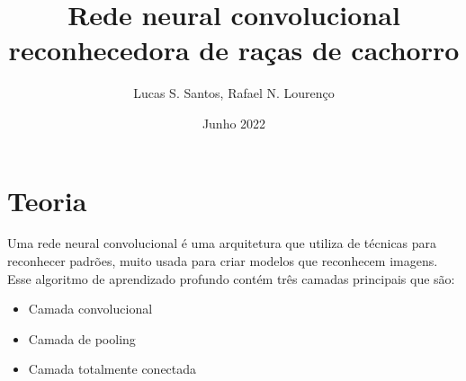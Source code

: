 \documentclass{article}
\title{Rede neural convolucional reconhecedora de raças de cachorro}
\author{Lucas S. Santos, Rafael N. Lourenço}
\date{Junho 2022}
\begin{document}
\maketitle
\newpage
\section{Teoria}
Uma rede neural convolucional é uma arquitetura que utiliza de técnicas para reconhecer padrões, muito usada para criar modelos que reconhecem imagens.
Esse algoritmo de aprendizado profundo contém três camadas principais que são:
\begin{itemize}
    \item Camada convolucional
    \item Camada de pooling
    \item Camada totalmente conectada
\end{itemize}
\end{document}
